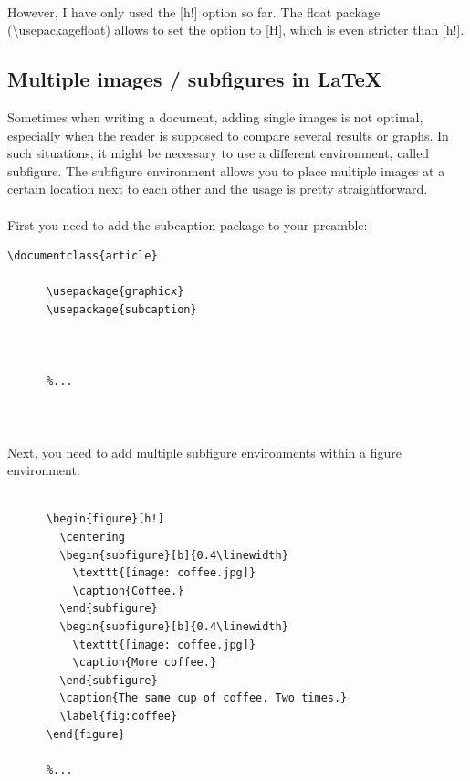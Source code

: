     \paragraph{ }
      However, I have only used the [h!] option so far. 
      The float package (\textbackslash usepackage{float}) 
      allows to set the option to [H], which is even stricter than [h!].

  \subsection{Multiple images / subfigures in LaTeX}
      Sometimes when writing a document, adding single images is not optimal, especially when the reader is supposed to compare several results or graphs. In such situations, it might be necessary to use a different environment, called subfigure. The subfigure environment allows you to place multiple images at a certain location next to each other and the usage is pretty straightforward.
    \paragraph{ }
      First you need to add the subcaption package to your preamble:
    \begin{lstlisting}[language={[LaTeX]TeX}, breaklines=true,frame=single]
      \documentclass{article}

      \usepackage{graphicx}
      \usepackage{subcaption}
      
      
      
      %...
      
      
    \end{lstlisting}
    \paragraph{ }
      Next, you need to add multiple subfigure environments within a figure environment.
    \begin{lstlisting}[language={[LaTeX]TeX}, breaklines=true,frame=single]
      %...

      \begin{figure}[h!]
        \centering
        \begin{subfigure}[b]{0.4\linewidth}
          \texttt{[image: coffee.jpg]}
          \caption{Coffee.}
        \end{subfigure}
        \begin{subfigure}[b]{0.4\linewidth}
          \texttt{[image: coffee.jpg]}
          \caption{More coffee.}
        \end{subfigure}
        \caption{The same cup of coffee. Two times.}
        \label{fig:coffee}
      \end{figure}
      
      %...
    \end{lstlisting}
